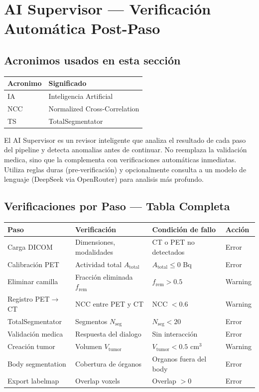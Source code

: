 \documentclass[12pt,a4paper]{article}
\begin{document}
\section{AI Supervisor --- Verificación Automática Post-Paso}
\label{sec:ai}

\subsection*{Acronimos usados en esta sección}
\begin{tabular}{ll}
\toprule
\textbf{Acronimo} & \textbf{Significado} \\
\midrule
IA & Inteligencia Artificial \\
NCC & Normalized Cross-Correlation \\
TS & TotalSegmentator \\
\bottomrule
\end{tabular}

El AI Supervisor es un revisor inteligente que analiza el resultado de cada paso del pipeline
y detecta anomalias antes de continuar. No reemplaza la validación medica, sino que la
complementa con verificaciones automáticas inmediatas. Utiliza reglas duras (pre-verificación)
y opcionalmente consulta a un modelo de lenguaje (DeepSeek via OpenRouter) para analisis más
profundo.

\subsection{Verificaciones por Paso --- Tabla Completa}

\begin{table}[H]
\centering
\begin{tabular}{l l l l}
\toprule
\textbf{Paso} & \textbf{Verificación} & \textbf{Condición de fallo} & \textbf{Acción} \\
\midrule
Carga DICOM & Dimensiones, modalidades & CT o PET no detectados & Error \\
Calibración PET & Actividad total $A_{\text{total}}$ & $A_{\text{total}} \leq 0$ Bq & Error \\
Eliminar camilla & Fracción eliminada $f_{\text{rem}}$ & $f_{\text{rem}} > 0.5$ & Warning \\
Registro PET$\to$CT & NCC entre PET y CT & NCC $< 0.6$ & Warning \\
TotalSegmentator & Segmentos $N_{\text{seg}}$ & $N_{\text{seg}} < 20$ & Error \\
Validación medica & Respuesta del dialogo & Sin interacción & Error \\
Creación tumor & Volumen $V_{\text{tumor}}$ & $V_{\text{tumor}} < 0.5$ cm$^3$ & Warning \\
Body segmentation & Cobertura de órganos & Organos fuera del body & Error \\
Export labelmap & Overlap voxels & Overlap $> 0$ & Error \\
\bottomrule
\end{tabular}
\end{table}
\end{document}
